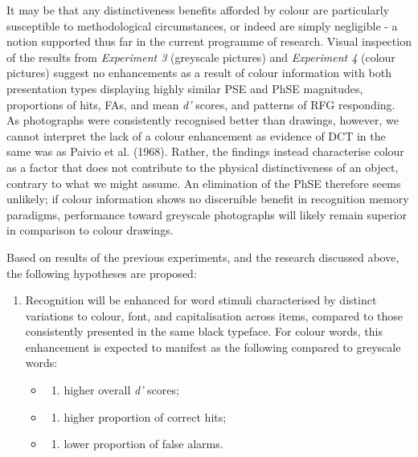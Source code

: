 \documentclass[
  11pt,
]{article}
\providecommand{\tightlist}{%
  \setlength{\itemsep}{0pt}\setlength{\parskip}{0pt}}
\begin{document}
It may be that any distinctiveness benefits afforded by colour are
particularly susceptible to methodological circumstances, or indeed are
simply negligible - a notion supported thus far in the current programme
of research. Visual inspection of the results from \emph{Experiment 3}
(greyscale pictures) and \emph{Experiment 4} (colour pictures) suggest
no enhancements as a result of colour information with both presentation
types displaying highly similar PSE and PhSE magnitudes, proportions of
hits, FAs, and mean \emph{d'} scores, and patterns of RFG responding. As
photographs were consistently recognised better than drawings, however,
we cannot interpret the lack of a colour enhancement as evidence of DCT
in the same was as Paivio et al. (1968). Rather, the findings instead
characterise colour as a factor that does not contribute to the physical
distinctiveness of an object, contrary to what we might assume. An
elimination of the PhSE therefore seems unlikely; if colour information
shows no discernible benefit in recognition memory paradigms,
performance toward greyscale photographs will likely remain superior in
comparison to colour drawings.

Based on results of the previous experiments, and the research discussed
above, the following hypotheses are proposed:

\begin{enumerate}
\def\labelenumi{\arabic{enumi}.}
\tightlist
\item
  Recognition will be enhanced for word stimuli characterised by
  distinct variations to colour, font, and capitalisation across items,
  compared to those consistently presented in the same black typeface.
  For colour words, this enhancement is expected to manifest as the
  following compared to greyscale words:

  \begin{itemize}
  \item
    \begin{enumerate}
    \def\labelenumii{\roman{enumii})}
    \tightlist
    \item
      higher overall \emph{d'} scores;
    \end{enumerate}
  \item
    \begin{enumerate}
    \def\labelenumii{\roman{enumii})}
    \setcounter{enumii}{1}
    \tightlist
    \item
      higher proportion of correct hits;
    \end{enumerate}
  \item
    \begin{enumerate}
    \def\labelenumii{\roman{enumii})}
    \setcounter{enumii}{2}
    \tightlist
    \item
      lower proportion of false alarms.
    \end{enumerate}
  \end{itemize}
\end{enumerate}
\end{document}
